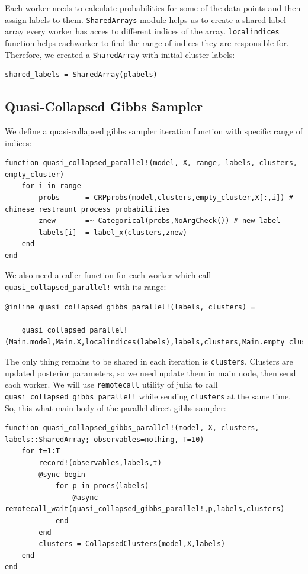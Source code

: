 \documentclass[a4paper]{article}
\begin{document}
Each worker needs to calculate probabilities for some of the data points
and then assign labels to them. \texttt{SharedArrays} module helps us to
create a shared label array every worker has acces to different indices
of the array. \texttt{localindices} function helps eachworker to find
the range of indices they are responsible for. Therefore, we created a
\texttt{SharedArray} with initial cluster labels:
\begin{lstlisting}
shared_labels = SharedArray(plabels)
\end{lstlisting}


\subsection{Quasi-Collapsed Gibbs Sampler}
We define a quasi-collapsed gibbs sampler iteration function with specific range
of indices:
\begin{lstlisting}[linewidth=17cm]
function quasi_collapsed_parallel!(model, X, range, labels, clusters, empty_cluster)
    for i in range
        probs      = CRPprobs(model,clusters,empty_cluster,X[:,i]) # chinese restraunt process probabilities
        znew       =~ Categorical(probs,NoArgCheck()) # new label
        labels[i]  = label_x(clusters,znew)
    end
end
\end{lstlisting}

We also need a caller function for each worker which call
\texttt{quasi\_collapsed\_parallel!} with its range:
\begin{lstlisting}
@inline quasi_collapsed_gibbs_parallel!(labels, clusters) =

    quasi_collapsed_parallel!(Main.model,Main.X,localindices(labels),labels,clusters,Main.empty_cluster)
\end{lstlisting}


The only thing remains to be shared in each iteration is
\texttt{clusters}. Clusters are updated posterior parameters, so we
need update them in main node, then send each worker. We will use
\texttt{remotecall} utility of julia to call
\texttt{quasi\_collapsed\_gibbs\_parallel!} while sending \texttt{clusters} at the
same time. So, this what main body of the parallel direct gibbs sampler:

\begin{lstlisting}
function quasi_collapsed_gibbs_parallel!(model, X, clusters, labels::SharedArray; observables=nothing, T=10)
    for t=1:T
        record!(observables,labels,t)
        @sync begin
            for p in procs(labels)
                @async remotecall_wait(quasi_collapsed_gibbs_parallel!,p,labels,clusters)
            end
        end
        clusters = CollapsedClusters(model,X,labels)
    end
end

\end{lstlisting}
\end{document}
